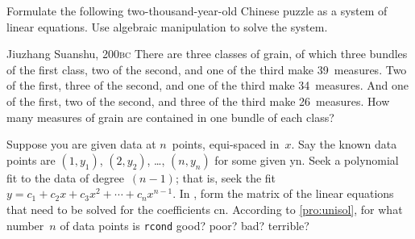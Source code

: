 \begin{exercise}  
Formulate the following two-thousand-year-old Chinese puzzle as a system of linear equations.
Use algebraic manipulation to solve the system.
\begin{quoted}{Jiuzhang Suanshu, 200\textsc{bc} \cite[p.3]{Chartier2015}}
There are three classes of grain, of which three bundles of the first class, two of the second, and one of the third make 39~measures.
Two of the first, three of the second, and one of the third make 34~measures.
And one of the first, two of the second, and three of the third make 26~measures.
How many measures of grain are contained in one bundle of each class?
\end{quoted}
\end{exercise}

\begin{exercise}  
Suppose you are given data at \(n\)~points, equi-spaced in~\(x\).
Say the known data points are \((1,y_1)\), \((2,y_2)\), \ldots, \((n,y_n)\) for some given \hlist yn.
Seek a polynomial fit to the data of degree~\((n-1)\); that is, seek the fit \(y=c_1+c_2x+c_3x^2+\cdots+c_{n}x^{n-1}\).
In \script, form the matrix of the linear equations that need to be solved for the coefficients \hlist cn.  
According to \cref{pro:unisol}, for what number~\(n\) of data points is \verb|rcond| good? poor? bad? terrible? 
\end{exercise}




